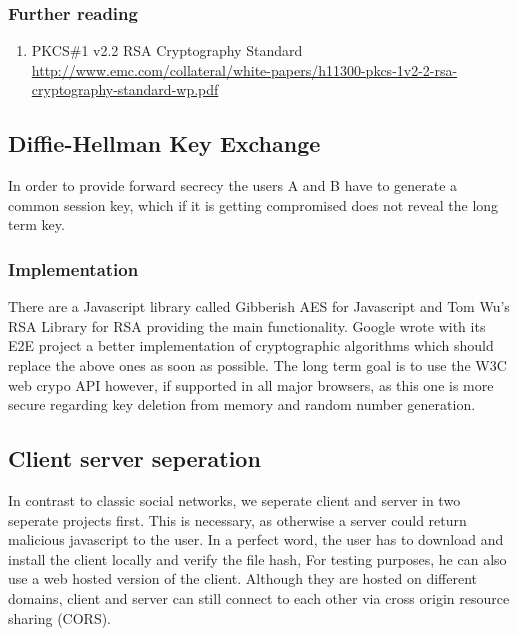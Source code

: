 \documentclass{scrartcl}
\begin{document}

\subsubsection{Further reading}
\begin{enumerate}
\item PKCS\#1 v2.2 RSA Cryptography Standard\\\url{http://www.emc.com/collateral/white-papers/h11300-pkcs-1v2-2-rsa-cryptography-standard-wp.pdf} 
\end{enumerate}

\subsection{Diffie-Hellman Key Exchange}
In order to provide forward secrecy the users A and B have to generate a common session key, which if it is getting compromised does not reveal the long term key.

\subsubsection{Implementation}
There are a Javascript library called Gibberish AES for Javascript and Tom Wu's RSA Library for RSA providing the main functionality. Google wrote with its E2E project a better implementation of cryptographic algorithms which should replace the above ones as soon as possible. The long term goal is to use the W3C web crypo API however, if supported in all major browsers, as this one is more secure regarding key deletion from memory and random number generation. 

 \subsection{Client server seperation}
In contrast to classic social networks, we seperate client and server in two seperate projects first. This is necessary, as otherwise a server could return malicious javascript to the user. In a perfect word, the user has to download and install the client locally and verify the file hash, For testing purposes, he can also use a web hosted version of the client. Although they are hosted on different domains, client and server can still connect to each other via cross origin resource sharing (CORS).
\end{document}
